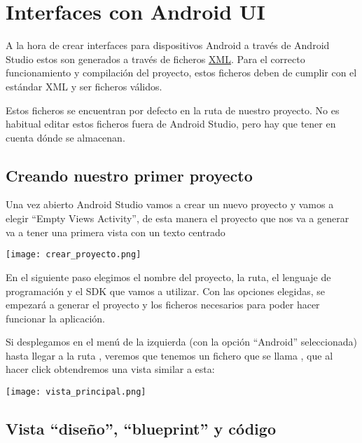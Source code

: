 \chapter{Interfaces con Android UI}

A la hora de crear interfaces para dispositivos Android a través de Android Studio estos son generados a través de ficheros \href{https://es.wikipedia.org/wiki/Extensible_Markup_Language}{XML}. Para el correcto funcionamiento y compilación del proyecto, estos ficheros deben de cumplir con el estándar XML y ser ficheros válidos.


Estos ficheros se encuentran por defecto en la ruta  de nuestro proyecto. No es habitual editar estos ficheros fuera de Android Studio, pero hay que tener en cuenta dónde se almacenan.

\section{Creando nuestro primer proyecto}

Una vez abierto Android Studio vamos a crear un nuevo proyecto y vamos a elegir “Empty Views Activity”, de esta manera el proyecto que nos va a generar va a tener una primera vista con un texto centrado

\begin{center}
    \texttt{[image: crear\_proyecto.png]}
\end{center}

En el siguiente paso elegimos el nombre del proyecto, la ruta, el lenguaje de programación y el SDK que vamos a utilizar. Con las opciones elegidas, se empezará a generar el proyecto y los ficheros necesarios para poder hacer funcionar la aplicación.

Si desplegamos en el menú de la izquierda (con la opción “Android” seleccionada) hasta llegar a la ruta , veremos que tenemos un fichero que se llama , que al hacer click obtendremos una vista similar a esta:

\begin{center}
    \texttt{[image: vista\_principal.png]}
\end{center}


\section{Vista “diseño”, “blueprint” y código}

